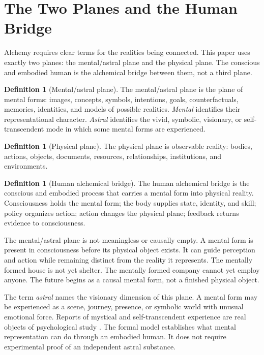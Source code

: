 \documentclass[11pt]{article}
\theoremstyle{plain}
\theoremstyle{definition}
\newtheorem{definition}[theorem]{Definition}
\begin{document}
\section{The Two Planes and the Human Bridge}

Alchemy requires clear terms for the realities being connected. This paper uses
exactly two planes: the mental/astral plane and the physical plane. The conscious and
embodied human is the alchemical bridge between them, not a third plane.

\begin{definition}[Mental/astral plane]
The mental/astral plane is the plane of mental forms: images, concepts, symbols,
intentions, goals, counterfactuals, memories, identities, and models of possible
realities. \emph{Mental} identifies their representational character. \emph{Astral}
identifies the vivid, symbolic, visionary, or self-transcendent mode in which some
mental forms are experienced.
\end{definition}

\begin{definition}[Physical plane]
The physical plane is observable reality: bodies, actions, objects, documents,
resources, relationships, institutions, and environments.
\end{definition}

\begin{definition}[Human alchemical bridge]
The human alchemical bridge is the conscious and embodied process that carries a
mental form into physical reality. Consciousness holds the mental form; the body
supplies state, identity, and skill; policy organizes action; action changes the
physical plane; feedback returns evidence to consciousness.
\end{definition}

The mental/astral plane is not meaningless or causally empty. A mental form is present
in consciousness before its physical object exists. It can guide perception and action
while remaining distinct from the reality it represents. The mentally formed house is
not yet shelter. The mentally formed company cannot yet employ anyone. The future
begins as a causal mental form, not a finished physical object.

The term \emph{astral} names the visionary dimension of this plane. A mental form may
be experienced as a scene, journey, presence, or symbolic world with unusual emotional
force. Reports of mystical and self-transcendent experience are real objects of
psychological study \citep{james1902varieties,yaden2017selftranscendent}. The formal
model establishes what mental representation can do through an embodied human. It
does not require experimental proof of an independent astral substance.
\end{document}
